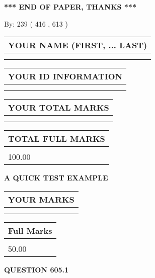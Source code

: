 \documentclass[12pt]{article}
\begin{document}
\vspace{1.0in} 
{\textbf{\large{ *** END OF PAPER, THANKS *** }}} 
   
   
\hspace{1.0in} By: 
 239 ( 416 ,  613 )
   
   
   
   
\newpage 
\setcounter{page}{ 
   605001 } 
   
   
   
   
\noindent\begin{tabular}{|l|}
\hline
YOUR NAME (FIRST, ... LAST)  \\
\hline
 \\ 
 \\ 
\hline
\end{tabular}
\hspace{0.05in} \begin{tabular}{|l|}
\hline
 YOUR   ID   INFORMATION  \\
\hline
 \\ 
 \\ 
\hline
\end{tabular}
   
   
\vspace{0.2in}\noindent\begin{tabular}{|l|}
\hline
YOUR TOTAL MARKS  \\
\hline
 \\ 
 \\ 
\hline
\end{tabular}
\hspace{0.05in} \begin{tabular}{|l|}
\hline
TOTAL FULL MARKS  \\
\hline
 \\ 
100.00 \\
\hline
\end{tabular}
   
   
 \vspace{0.2in}
{\LARGE {\textbf{ A QUICK TEST EXAMPLE}}}
   
   
  
\vspace{0.2in}
  
\noindent\begin{tabular}{|l|}
\hline
 YOUR MARKS  \\
\hline
 \\ 
 \\ 
\hline
\end{tabular}
\hspace{0.05in} \begin{tabular}{|l|}
\hline
 Full Marks  \\
\hline
 \\ 
50.00 \\
\hline
\end{tabular}
{\textbf{\Large{QUESTION
605.1 
}}}
  
\end{document}
